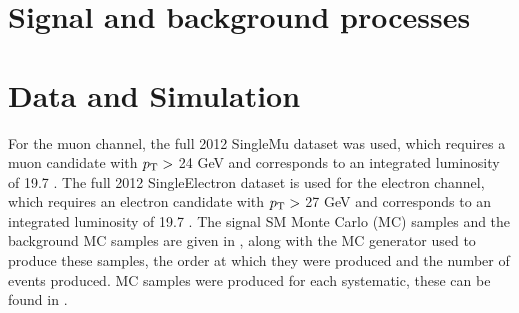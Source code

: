 
\section{Signal and background processes}
\label{sec:sigback}

\section{Data and Simulation}
\label{sec:datasimulation}

For the muon channel, the full 2012 SingleMu dataset was used, which requires a muon candidate with $p_{\mathrm{T}} > $ 24 GeV and corresponds to an integrated luminosity of 19.7 \fbinv .  The full 2012 SingleElectron dataset is used for the electron channel, which requires an electron candidate with $p_{\mathrm{T}} > $ 27 GeV and corresponds to an integrated luminosity of 19.7 \fbinv.
The signal SM \tttt Monte Carlo (MC) samples and the background MC samples are given in , along with the MC generator used to produce these samples, the order at which they were produced and the number of events produced. MC samples were produced for each systematic, these can be found in .

